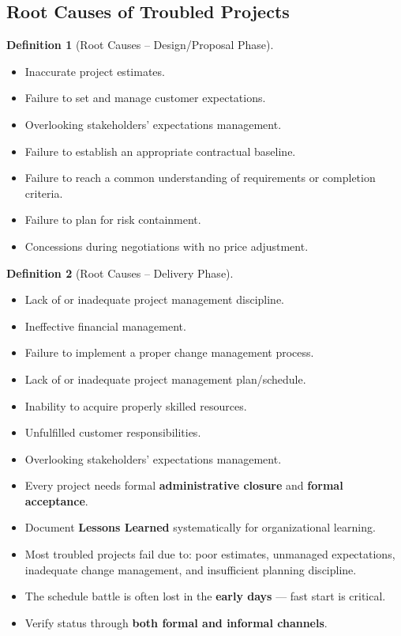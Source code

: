 \documentclass[11pt,a4paper]{article}
\theoremstyle{definition}
\newtheorem{definition}{Definition}[section]
\theoremstyle{plain}
\begin{document}
\subsection{Root Causes of Troubled Projects}

\begin{definition}[Root Causes -- Design/Proposal Phase]
\begin{itemize}[nosep]
  \item Inaccurate project estimates.
  \item Failure to set and manage customer expectations.
  \item Overlooking stakeholders' expectations management.
  \item Failure to establish an appropriate contractual baseline.
  \item Failure to reach a common understanding of requirements or completion criteria.
  \item Failure to plan for risk containment.
  \item Concessions during negotiations with no price adjustment.
\end{itemize}
\end{definition}

\begin{definition}[Root Causes -- Delivery Phase]
\begin{itemize}[nosep]
  \item Lack of or inadequate project management discipline.
  \item Ineffective financial management.
  \item Failure to implement a proper change management process.
  \item Lack of or inadequate project management plan/schedule.
  \item Inability to acquire properly skilled resources.
  \item Unfulfilled customer responsibilities.
  \item Overlooking stakeholders' expectations management.
\end{itemize}
\end{definition}

\begin{keytakeaways}
\begin{itemize}[nosep]
  \item Every project needs formal \textbf{administrative closure} and \textbf{formal acceptance}.
  \item Document \textbf{Lessons Learned} systematically for organizational learning.
  \item Most troubled projects fail due to: poor estimates, unmanaged expectations, inadequate change management, and insufficient planning discipline.
  \item The schedule battle is often lost in the \textbf{early days} --- fast start is critical.
  \item Verify status through \textbf{both formal and informal channels}.
\end{itemize}
\end{keytakeaways}
\end{document}
